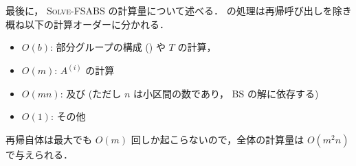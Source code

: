 最後に， \textsc{Solve-FSABS} の計算量について述べる．  の処理は再帰呼び出しを除き概ね以下の計算オーダーに分かれる．
\begin{itemize}
\item $O(b)$: 部分グループの構成 (\label{subgroup}) や $T$ の計算， 
\item $O(m)$: $A^{(i)}$ の計算
\item $O(mn)$:  及び  (ただし $n$ は小区間の数であり， BS の解に依存する)
\item $O(1)$: その他
\end{itemize}
再帰自体は最大でも $O(m)$ 回しか起こらないので，全体の計算量は $O(m^2n)$ で与えられる．

